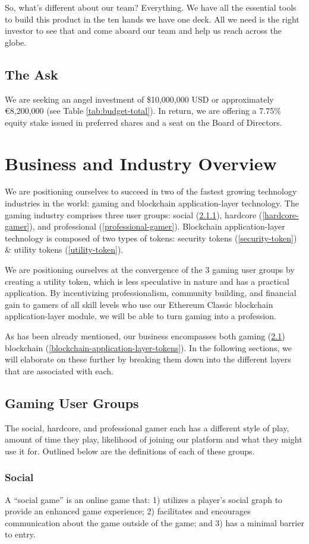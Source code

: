 \documentclass[11pt]{report}
\begin{document}
So, what's different about our team? Everything. We have all the essential tools to build this product in the ten hands we have one deck. All we need is the right investor to see that and come aboard our team and help us reach across the globe.
\section{The Ask}
We are seeking an angel investment of \$10,000,000 USD or approximately \euro8,200,000 (see Table \ref{tab:budget-total}). In return, we are offering a 7.75\% equity stake issued in preferred shares and a seat on the Board of Directors.
\chapter{Business and Industry Overview}
We are positioning ourselves to succeed in two of the fastest growing technology industries in the world: gaming and blockchain application-layer technology. The gaming industry comprises three user groups: social (\ref{social-gamer}), hardcore (\ref{hardcore-gamer}), and professional (\ref{professional-gamer}). Blockchain application-layer technology is composed of two types of tokens: security tokens (\ref{security-token}) \& utility tokens (\ref{utility-token}).

We are positioning ourselves at the convergence of the 3 gaming user groups by creating a utility token, which is less speculative in nature and has a practical application. By incentivizing professionalism, community building, and financial gain to gamers of all skill levels who use our Ethereum Classic blockchain application-layer module, we will be able to turn gaming into a profession.

As has been already mentioned, our business encompasses both gaming (\ref{gaming-industry}) blockchain (\ref{blockchain-application-layer-tokens}). In the following sections, we will elaborate on these further by breaking them down into the different layers that are associated with each.
\section{Gaming User Groups}\label{gaming-industry}
The social, hardcore, and professional gamer each has a different style of play, amount of time they play, likelihood of joining our platform and what they might use it for. Outlined below are the definitions of each of these groups.
\subsection{Social}\label{social-gamer}
A ``social game'' is an online game that: 1) utilizes a player's social graph to provide an enhanced game experience; 2) facilitates and encourages communication about the game outside of the game; and 3) has a minimal barrier to entry.\cite{social-game}
\end{document}
